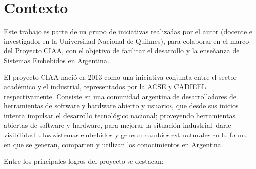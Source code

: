 \section{Contexto}
\label{sec:contexto}

Este trabajo es parte de un grupo de iniciativas realizadas por el autor (docente e investigador en la Universidad Nacional de Quilmes), para colaborar en el marco del Proyecto CIAA, con el objetivo de facilitar el desarrollo y la enseñanza de Sistemas Embebidos en Argentina.

El proyecto CIAA nació en 2013 como una iniciativa conjunta entre el sector académico y el industrial, representados por la ACSE \citep{ACSE} y CADIEEL \citep{CADIEEL} respectivamente. Consiste en una comunidad argentina de desarrolladores de herramientas de software y hardware abierto y usuarios, que desde sus inicios intenta impulsar el desarrollo tecnológico nacional; proveyendo herramientas abiertas de software y hardware, para mejorar la situación industrial, darle visibilidad a los sistemas embebidos y generar cambios estructurales en la forma en que se generan, comparten y utilizan los conocimientos en Argentina.


Entre los principales logros del proyecto se destacan:

